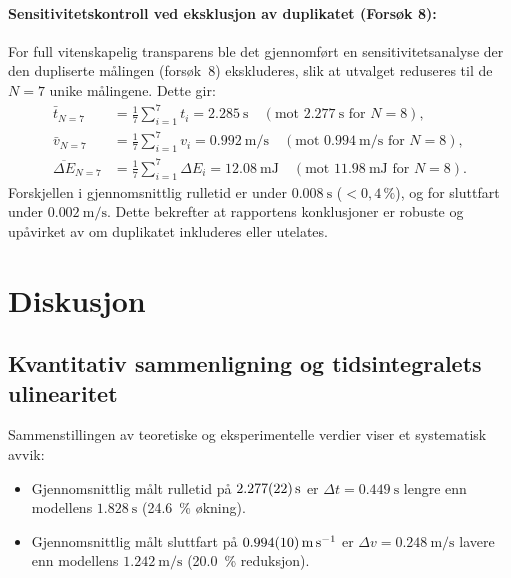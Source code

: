 \documentclass[11pt,a4paper]{article}
\begin{document}
\paragraph{Sensitivitetskontroll ved eksklusjon av duplikatet (Forsøk 8):}
For full vitenskapelig transparens ble det gjennomført en sensitivitetsanalyse der den dupliserte målingen (forsøk~8) ekskluderes, slik at utvalget reduseres til de $N = 7$ unike målingene. Dette gir:
\begin{align*}
    \bar{t}_{N=7} &= \frac{1}{7}\sum_{i=1}^7 t_i = \SI{2,285}{\second} \quad (\text{mot } \SI{2,277}{\second} \text{ for } N=8), \\
    \bar{v}_{N=7} &= \frac{1}{7}\sum_{i=1}^7 v_i = \SI{0,992}{\meter\per\second} \quad (\text{mot } \SI{0,994}{\meter\per\second} \text{ for } N=8), \\
    \overline{\Delta E}_{N=7} &= \frac{1}{7}\sum_{i=1}^7 \Delta E_i = \SI{12,08}{\milli\joule} \quad (\text{mot } \SI{11,98}{\milli\joule} \text{ for } N=8).
\end{align*}
Forskjellen i gjennomsnittlig rulletid er under $\SI{0,008}{\second}$ ($< 0{,}4\,\%$), og for sluttfart under $\SI{0,002}{\meter\per\second}$. Dette bekrefter at rapportens konklusjoner er robuste og upåvirket av om duplikatet inkluderes eller utelates.

\section{Diskusjon}

\subsection{Kvantitativ sammenligning og tidsintegralets ulinearitet}
Sammenstillingen av teoretiske og eksperimentelle verdier viser et systematisk avvik:
\begin{itemize}
    \item Gjennomsnittlig målt rulletid på $\SI{2,277 \pm 0,022}{\second}$ er $\Delta t = \SI{0,449}{\second}$ lengre enn modellens $\SI{1,828}{\second}$ (\SI{24,6}{\percent} økning).
    \item Gjennomsnittlig målt sluttfart på $\SI{0,994 \pm 0,010}{\meter\per\second}$ er $\Delta v = \SI{0,248}{\meter\per\second}$ lavere enn modellens $\SI{1,242}{\meter\per\second}$ (\SI{20,0}{\percent} reduksjon).
\end{itemize}
\end{document}
